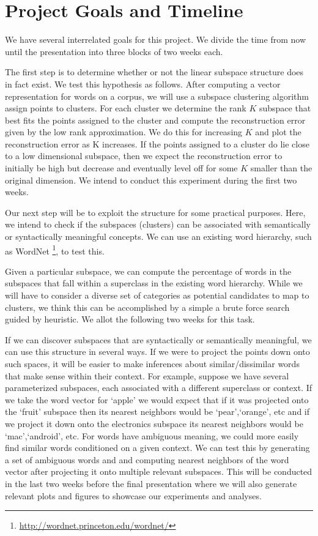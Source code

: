 \section{Project Goals and Timeline}\label{sec:timeline}

We have several interrelated goals for this project. 
We divide the time from now until the presentation into three blocks of two weeks each.
 
The first step is to determine whether or not the linear subspace structure does in fact exist. 
We test this hypothesis as follows. 
 After computing a vector representation for words on a corpus, we will use a subspace clustering algorithm assign points to clusters. 
For each cluster we determine the rank $K$ subspace that best fits the points assigned to the cluster and compute the reconstruction error given by the low rank approximation. 
We do this for increasing $K$ and plot the reconstruction error as K increases. 
If the points assigned to a cluster do lie close to a low dimensional subspace, then we expect the reconstruction error to initially be high but decrease and eventually level off for some $K$ smaller than the original dimension. 
We intend to conduct this experiment during the first two weeks.
 
Our next step will be to exploit the structure for some practical purposes. 
Here, we intend to check if the subspaces (clusters) can be associated with semantically or syntactically meaningful concepts. 
We can use an existing word hierarchy, such as WordNet \footnote{\url{http://wordnet.princeton.edu/wordnet/}}, to test this. 
 
Given a particular subspace, we can compute the percentage of words in the subspaces that fall within a superclass in the existing word hierarchy. While we will have to consider a diverse set of categories as potential candidates to map to clusters, we think this can be accomplished by a simple a brute force search guided by heuristic. We allot the following two weeks for this task. 

If we can discover subspaces that are syntactically or semantically meaningful, we can use this structure in several ways. If we were to project the points down onto such spaces, it will be easier to make inferences about similar/dissimilar words that make sense within their context. 
For example, suppose we have several parameterized subspaces, each associated with a different superclass or context. 
If we take the word vector for `apple' we would expect that if it was projected onto the `fruit' subspace then its nearest neighbors would be `pear',`orange', etc and if we project it down onto the electronics subspace its nearest neighbors would be `mac',`android', etc. 
For words have ambiguous meaning,  we could more easily find similar words conditioned on a given context. 
We can test this by generating a set of ambiguous words and and computing nearest neighbors of the word vector after projecting it onto multiple relevant subspaces. 
This will be conducted in the last two weeks before the final presentation where we will also generate relevant plots and figures to showcase our experiments and analyses. 